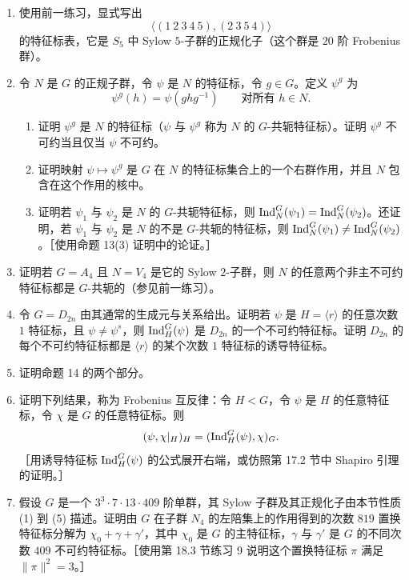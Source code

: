 \begin{enumerate}[label=\arabic*.]
\begin{enumerate}[label=(\alph*)]
  \end{enumerate}
  \item 使用前一练习，显式写出
  \[
    \langle(1\ 2\ 3\ 4\ 5),(2\ 3\ 5\ 4)\rangle
  \]
  的特征标表，它是 $S_5$ 中 Sylow $5$-子群的正规化子（这个群是 $20$ 阶 Frobenius 群）。
  \item 令 $N$ 是 $G$ 的正规子群，令 $\psi$ 是 $N$ 的特征标，令 $g\in G$。定义 $\psi^g$ 为
  \[
    \psi^g(h)=\psi(ghg^{-1})\qquad\text{对所有 }h\in N.
  \]
  \begin{enumerate}[label=(\alph*)]
    \item 证明 $\psi^g$ 是 $N$ 的特征标（$\psi$ 与 $\psi^g$ 称为 $N$ 的 $G$-共轭特征标）。证明 $\psi^g$ 不可约当且仅当 $\psi$ 不可约。
    \item 证明映射 $\psi\mapsto\psi^g$ 是 $G$ 在 $N$ 的特征标集合上的一个右群作用，并且 $N$ 包含在这个作用的核中。
    \item 证明若 $\psi_1$ 与 $\psi_2$ 是 $N$ 的 $G$-共轭特征标，则 $\operatorname{Ind}_N^G(\psi_1)=\operatorname{Ind}_N^G(\psi_2)$。还证明，若 $\psi_1$ 与 $\psi_2$ 是 $N$ 的不是 $G$-共轭的特征标，则 $\operatorname{Ind}_N^G(\psi_1)\neq\operatorname{Ind}_N^G(\psi_2)$。［使用命题 13(3) 证明中的论证。］
  \end{enumerate}
  \item 证明若 $G=A_4$ 且 $N=V_4$ 是它的 Sylow $2$-子群，则 $N$ 的任意两个非主不可约特征标都是 $G$-共轭的（参见前一练习）。
  \item 令 $G=D_{2n}$ 由其通常的生成元与关系给出。证明若 $\psi$ 是 $H=\langle r\rangle$ 的任意次数 $1$ 特征标，且 $\psi\neq\psi^s$，则 $\operatorname{Ind}_H^G(\psi)$ 是 $D_{2n}$ 的一个不可约特征标。证明 $D_{2n}$ 的每个不可约特征标都是 $\langle r\rangle$ 的某个次数 $1$ 特征标的诱导特征标。
  \item 证明命题 14 的两个部分。
  \item 证明下列结果，称为 Frobenius 互反律：令 $H<G$，令 $\psi$ 是 $H$ 的任意特征标，令 $\chi$ 是 $G$ 的任意特征标。则
  \[
    (\psi,\chi|_H)_H=(\operatorname{Ind}_H^G(\psi),\chi)_G.
  \]
  ［用诱导特征标 $\operatorname{Ind}_H^G(\psi)$ 的公式展开右端，或仿照第 17.2 节中 Shapiro 引理的证明。］
  \item 假设 $G$ 是一个 $3^3\cdot7\cdot13\cdot409$ 阶单群，其 Sylow 子群及其正规化子由本节性质 (1) 到 (5) 描述。证明由 $G$ 在子群 $N_4$ 的左陪集上的作用得到的次数 $819$ 置换特征标分解为 $\chi_0+\gamma+\gamma'$，其中 $\chi_0$ 是 $G$ 的主特征标，$\gamma$ 与 $\gamma'$ 是 $G$ 的不同次数 $409$ 不可约特征标。［使用第 18.3 节练习 9 说明这个置换特征标 $\pi$ 满足 $\|\pi\|^2=3$。］
\end{enumerate}
